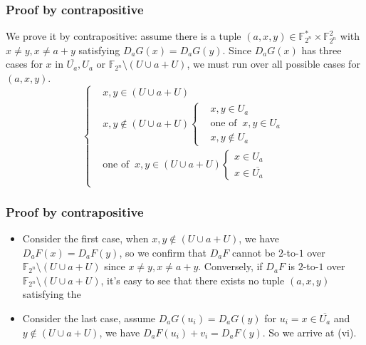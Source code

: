 \documentclass[
    aspectratio=169,                   %
]{beamer}
\newcommand{\F}{\mathbb{F}}
\begin{document}
    \begin{frame}
        \frametitle{Proof by contrapositive}
    
        We prove it by contrapositive: assume there is a tuple $ (a,x,y)\in\F_{2^n}^*\times\F_{2^n}^2 $ with $ x\neq y,x\neq a+y $ satisfying $ D_aG(x)=D_aG(y) $.
        Since $ D_aG(x) $ has three cases for $ x $ in $ \overline{U_a},U_a $ or $ \F_{2^n}\setminus(U\cup a+U) $, we must run over 
        all possible cases for $ (a,x,y) $. 
        \[\left\{
            \begin{aligned}
                &x,y\in(U\cup a+U)\\
                &x,y\notin(U\cup a+U)\left\{\begin{aligned}
                    &x,y\in U_a\\
                    &\text{one of }~x,y\in U_a\\
                    &x,y\notin U_a
                \end{aligned}\right.\\
                &\text{one of }~x,y\in(U\cup a+U)\left\{\begin{aligned}
                    x\in U_a\\
                    x\in\overline{U_a}
                \end{aligned}\right.\\
            \end{aligned}
        \right.\]
    
    \end{frame}

    \begin{frame}
        \frametitle{Proof by contrapositive}
        \begin{itemize}
            \item Consider the first case, when $ x,y\notin(U\cup a+U) $, we have $ D_aF(x)=D_aF(y) $, so we confirm that $ D_aF $ cannot be $ 2 $-to-$ 1 $ over
            $ \F_{2^n}\setminus(U\cup a+U) $ since $ x\neq y,x\neq a+y $. Conversely, if $ D_aF $ is $ 2 $-to-$ 1 $ over $ \F_{2^n}\setminus(U\cup a+U) $,
            it's easy to see that there exists no tuple $ (a,x,y) $ satisfying the 
            
            \item Consider the last case, assume $ D_aG(u_i)=D_aG(y) $ for $ u_i=x\in\overline{U_a} $ and $ y\notin(U\cup a+U) $, we have 
            $ D_aF(u_i)+v_i=D_aF(y) $. So we arrive at (vi).
        \end{itemize}

    \end{frame}
\end{document}
